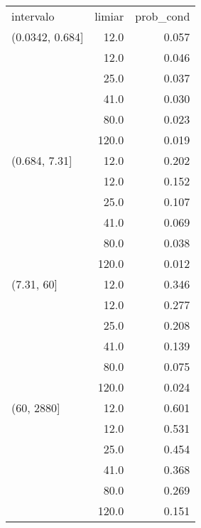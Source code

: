 \begin{table}[ht]
\centering
\begin{tabular}{lrr}
 intervalo & limiar & prob\_cond \\ 
 (0.0342, 0.684] & 12.0 & 0.057 \\ 
   & 12.0 & 0.046 \\ 
   & 25.0 & 0.037 \\ 
   & 41.0 & 0.030 \\ 
   & 80.0 & 0.023 \\ 
   & 120.0 & 0.019 \\ 
  (0.684, 7.31] & 12.0 & 0.202 \\ 
   & 12.0 & 0.152 \\ 
   & 25.0 & 0.107 \\ 
   & 41.0 & 0.069 \\ 
   & 80.0 & 0.038 \\ 
   & 120.0 & 0.012 \\ 
  (7.31, 60] & 12.0 & 0.346 \\ 
   & 12.0 & 0.277 \\ 
   & 25.0 & 0.208 \\ 
   & 41.0 & 0.139 \\ 
   & 80.0 & 0.075 \\ 
   & 120.0 & 0.024 \\ 
  (60, 2880] & 12.0 & 0.601 \\ 
   & 12.0 & 0.531 \\ 
   & 25.0 & 0.454 \\ 
   & 41.0 & 0.368 \\ 
   & 80.0 & 0.269 \\ 
   & 120.0 & 0.151 \\ 
  \end{tabular}
\end{table}
